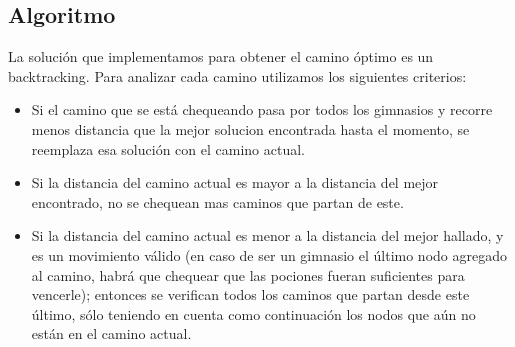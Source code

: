 \subsection{Algoritmo}

La solución que implementamos para obtener el camino óptimo es un backtracking. 
Para analizar cada camino utilizamos los siguientes criterios:
\begin{itemize}
    \item Si el camino que se está chequeando pasa por todos los gimnasios y recorre menos distancia que la mejor solucion encontrada hasta el momento, se reemplaza esa solución con el camino actual.
    \item Si la distancia del camino actual es mayor a la distancia del mejor encontrado, no se chequean mas caminos que partan de este.
    \item Si la distancia del camino actual es menor a la distancia del mejor hallado, y es un movimiento válido (en caso de ser un gimnasio el último nodo agregado al camino, habrá que chequear que las pociones fueran suficientes para vencerle); entonces se verifican todos los caminos que partan desde este último, sólo teniendo en cuenta como continuación los nodos que aún no están en el camino actual.
\end{itemize}

